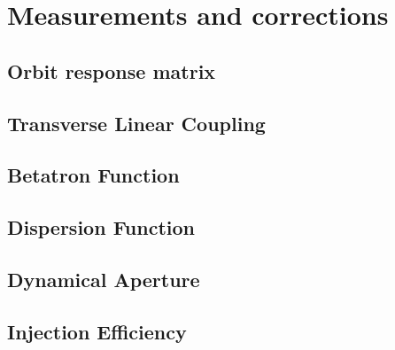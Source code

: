 \chapter{Measurements and corrections}

\section{Orbit response matrix}
\section{Transverse Linear Coupling}
\section{Betatron Function}
\section{Dispersion Function}
\section{Dynamical Aperture}
\section{Injection Efficiency}

